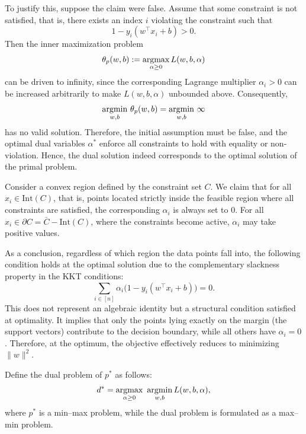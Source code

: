 \documentclass[../main]{subfiles}
\begin{document}
To justify this, suppose the claim were false.  
Assume that some constraint is not satisfied, that is, there exists an index $i$ violating the constraint such that
\begin{equation}
    1 - y_i(w^\top x_i + b) > 0.
\end{equation}
Then the inner maximization problem
\begin{equation}
    \theta_p(w,b) := \mathop{\mathrm{argmax}}_{\alpha \ge 0} L(w,b,\alpha)
\end{equation}
can be driven to infinity, since the corresponding Lagrange multiplier $\alpha_i > 0$ can be increased arbitrarily to make $L(w,b,\alpha)$ unbounded above. Consequently,
\begin{equation}
    \mathop{\mathrm{argmin}}_{w,b}\, \theta_p(w,b) = \mathop{\mathrm{argmin}}_{w,b}\, \infty
\end{equation}
has no valid solution. Therefore, the initial assumption must be false, and the optimal dual variables $\alpha^*$ enforce all constraints to hold with equality or non-violation. Hence, the dual solution indeed corresponds to the optimal solution of the primal problem.
\vspace{1em}

Consider a convex region defined by the constraint set $C$.  
We claim that for all $x_i \in \mathrm{Int}(C)$, that is, points located strictly inside the feasible region where all constraints are satisfied, the corresponding $\alpha_i$ is always set to $0$.  
For all $x_i \in \partial C = \bar{C} - \mathrm{Int}(C)$, where the constraints become active, $\alpha_i$ may take positive values. 

As a conclusion, regardless of which region the data points fall into, the following condition holds at the optimal solution due to the {complementary slackness} property in the KKT conditions:
\begin{equation}
    \sum_{i \in [n]} \alpha_i \big(1 - y_i(w^\top x_i + b)\big) = 0.
\end{equation}
This does not represent an algebraic identity but a structural condition satisfied at optimality.  
It implies that only the points lying exactly on the margin (the {support vectors}) contribute to the decision boundary, while all others have $\alpha_i = 0$.  
Therefore, at the optimum, the objective effectively reduces to minimizing $\|w\|^2$.

Define the dual problem of $p^*$ as follows:
\begin{equation}
    d^* = \argmax_{\alpha \ge 0}\ \argmin_{w,b} L(w,b,\alpha),
\end{equation}
where $p^*$ is a min–max problem, while the dual problem is formulated as a max–min problem.
\end{document}

